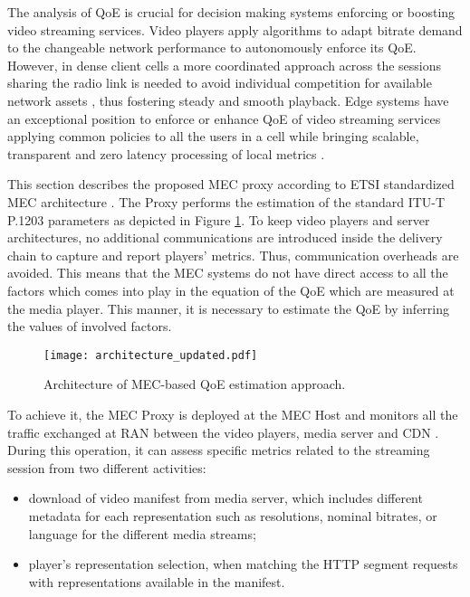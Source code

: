 The analysis of QoE is crucial for decision making systems enforcing or boosting video streaming services. Video players apply algorithms to adapt bitrate demand to the changeable network performance to autonomously enforce its QoE. However, in dense client cells a more coordinated approach across the sessions sharing the radio link is needed to avoid individual competition for available network assets \cite{akhshabi2012}, thus fostering steady and smooth playback. Edge systems have an exceptional position to enforce or enhance QoE of video streaming services applying common policies to all the users in a cell while bringing scalable, transparent and zero latency processing of local metrics \cite{etsigsmec002}.

This section describes the proposed MEC proxy according to ETSI standardized MEC architecture \cite{etsigsmec002}. The Proxy performs the estimation of the standard ITU-T P.1203 \cite{itup1203} parameters as depicted in Figure \ref{fig:MTAP2020architecture}. To keep video players and server architectures, no additional communications are introduced inside the delivery chain to capture and report players' metrics. Thus, communication overheads are avoided. This means that the MEC systems do not have direct access to all the factors which comes into play in the equation of the QoE which are measured at the media player. This manner, it is necessary to estimate the QoE by inferring the values of involved factors.

\begin{figure}[htp]
	\centering
	\texttt{[image: architecture\_updated.pdf]}
	\caption{Architecture of MEC-based QoE estimation approach.}
	\label{fig:MTAP2020architecture} %
\end{figure}

To achieve it, the MEC Proxy is deployed at the MEC Host and monitors all the traffic exchanged at RAN between the video players, media server and CDN \cite{etsigsmec002}. During this operation, it can assess specific metrics related to the streaming session from two different activities:
\begin{itemize}
	\item download of video manifest from media server, which includes different metadata for each representation such as resolutions, nominal bitrates, or language for the different media streams;
	\item player's representation selection, when matching the HTTP segment requests with representations available in the manifest.
\end{itemize}

